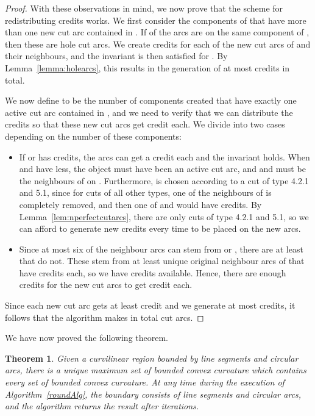 \documentclass{article}
\newtheorem{theorem}{Theorem}[section]
\begin{document}
\begin{proof}
With these observations in mind, we now prove that the scheme for redistributing credits works.
We first consider the components of  that have more than one new cut arc contained in . 
If  of the arcs  are on the same component  of , then these are hole cut arcs.
We create  credits for each of the  new cut arcs of  and their neighbours, and the invariant is then satisfied for .
By Lemma~\ref{lemma:holearcs}, this results in the generation of at most  credits in total.

We now define  to be the number of components created that have exactly one active cut arc contained in , and we need to verify that we can distribute the credits so that these  new cut arcs get  credit each.
We divide into two cases depending on the number  of these components:
\begin{itemize}
\item[]
If  or  has  credits, the  arcs can get a credit each and the invariant holds.
When  and  have less, the object  must have been an active cut arc, and  and  must be the neighbours of  on .
Furthermore,  is chosen according to a cut of type 4.2.1 and 5.1, since for cuts of all other types, one of the neighbours of  is completely removed, and then one of  and  would have  credits.
By Lemma~\ref{lem:nperfectcutarcs}, there are only  cuts of type 4.2.1 and 5.1, so we can afford to generate  new credits every time to be placed on the new arcs.

\item[]
Since at most six of the neighbour arcs can stem from  or , there are at least  that do not.
These stem from at least  unique original neighbour arcs of  that have  credits each, so we have  credits available.
Hence, there are enough credits for the  new cut arcs to get  credit each.
\end{itemize}

Since each new cut arc gets at least  credit and we generate at most  credits, it follows that the algorithm makes in total  cut arcs.
\end{proof}

We have now proved the following theorem.

\begin{theorem}\label{LTThm}
Given a curvilinear region  bounded by  line segments and circular arcs,
there is a unique maximum set 
of bounded convex curvature
which contains every set 
of bounded convex curvature.
At any time during the execution of Algorithm~\ref{roundAlg}, the boundary
 consists of  line segments and circular arcs, and
the algorithm returns the result  after  iterations.
\end{theorem}
\end{document}
